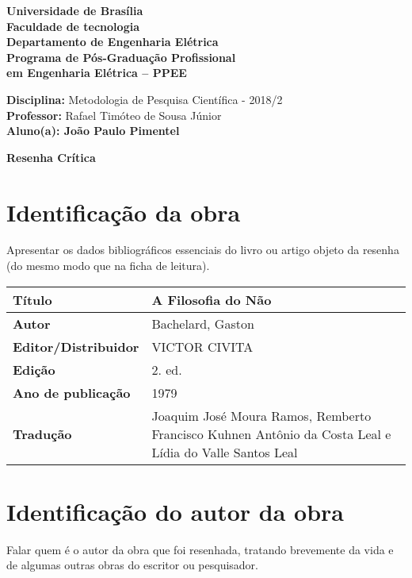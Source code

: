 \documentclass[11pt]{article}
\begin{document}
\noindent
\begin{center}
	\Large\textbf{Universidade de Brasília}\\
	\Large\textbf{Faculdade de tecnologia}\\
	\Large\textbf{Departamento de Engenharia Elétrica}\\
	\Large\textbf{Programa de Pós-Graduação Profissional \\
		em Engenharia Elétrica -- PPEE}\\
\end{center}

\large{
	\noindent
	\textbf{Disciplina:} Metodologia de Pesquisa Científica - 2018/2\\
	\textbf{Professor:} Rafael Timóteo de Sousa Júnior \\
	\textbf{Aluno(a): João Paulo Pimentel}}\\

\begin{center}
\Large\textbf{Resenha Crítica}
\end{center}
\normalsize

\section{Identificação da obra}
Apresentar os dados bibliográficos essenciais do livro ou artigo objeto da resenha (do mesmo modo que na ficha de leitura).

\begin{center}
	\begin{tabular}{|l|l|} \hline
		\textbf{Título} & A Filosofia do Não\cite{Bachelard1979} \\ \hline
		\textbf{Autor} & Bachelard, Gaston \\ \hline
		\textbf{Editor/Distribuidor} & VICTOR CIVITA
 \\ \hline
		\textbf{Edição} & 2. ed. \\ \hline
		\textbf{Ano de publicação} & 1979 \\ \hline
		\textbf{Tradução} &  Joaquim José Moura Ramos, Remberto Francisco Kuhnen Antônio da Costa Leal e Lídia do Valle Santos Leal \\ \hline
	\end{tabular}
\end{center}

\section{Identificação do autor da obra}
Falar quem é o autor da obra que foi resenhada, tratando brevemente da vida e de algumas outras obras do escritor ou pesquisador.
\end{document}
